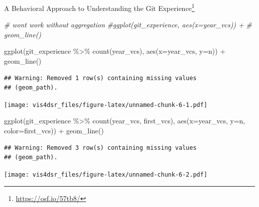 \documentclass[
]{krantz}
\makeatletter
\newenvironment{Shaded}{\begin{snugshade}}{\end{snugshade}}
\newcommand{\AttributeTok}[1]{\textcolor[rgb]{0.61,0.61,0.61}{#1}}
\newcommand{\CommentTok}[1]{\textcolor[rgb]{0.37,0.37,0.37}{\textit{#1}}}
\newcommand{\FunctionTok}[1]{\textcolor[rgb]{0,0,0}{#1}}
\newcommand{\NormalTok}[1]{#1}
\newcommand{\SpecialCharTok}[1]{\textcolor[rgb]{0,0,0}{#1}}
\renewcommand{\href}[2]{#2\footnote{\url{#1}}}
\newenvironment{kframe}{%
\medskip{}
\setlength{\fboxsep}{.8em}
 \def\at@end@of@kframe{}%
 \ifinner\ifhmode%
  \def\at@end@of@kframe{\end{minipage}}%
  \begin{minipage}{\columnwidth}%
 \fi\fi%
 \def\FrameCommand##1{\hskip\@totalleftmargin \hskip-\fboxsep
 \colorbox{shadecolor}{##1}\hskip-\fboxsep
     \hskip-\linewidth \hskip-\@totalleftmargin \hskip\columnwidth}%
 \MakeFramed {\advance\hsize-\width
   \@totalleftmargin\z@ \linewidth\hsize
   \@setminipage}}%
 {\par\unskip\endMakeFramed%
 \at@end@of@kframe}
\renewenvironment{Shaded}{\begin{kframe}}{\end{kframe}}
\makeatother
\begin{document}
\href{https://osf.io/57tb8/}{A Behavioral Approach to Understanding the Git Experience}

\begin{Shaded}
\begin{Highlighting}[]
\CommentTok{\# won\textquotesingle{}t work without aggregation}
\CommentTok{\#ggplot(git\_experience, aes(x=year\_vcs)) +}
\CommentTok{\#  geom\_line()}

\FunctionTok{ggplot}\NormalTok{(git\_experience }\SpecialCharTok{\%\textgreater{}\%} \FunctionTok{count}\NormalTok{(year\_vcs), }\FunctionTok{aes}\NormalTok{(}\AttributeTok{x=}\NormalTok{year\_vcs, }\AttributeTok{y=}\NormalTok{n)) }\SpecialCharTok{+}
  \FunctionTok{geom\_line}\NormalTok{()}
\end{Highlighting}
\end{Shaded}

\begin{verbatim}
## Warning: Removed 1 row(s) containing missing values
## (geom_path).
\end{verbatim}

\texttt{[image: vis4dsr\_files/figure-latex/unnamed-chunk-6-1.pdf]}

\begin{Shaded}
\begin{Highlighting}[]
\FunctionTok{ggplot}\NormalTok{(git\_experience }\SpecialCharTok{\%\textgreater{}\%} \FunctionTok{count}\NormalTok{(year\_vcs, first\_vcs), }\FunctionTok{aes}\NormalTok{(}\AttributeTok{x=}\NormalTok{year\_vcs, }\AttributeTok{y=}\NormalTok{n, }\AttributeTok{color=}\NormalTok{first\_vcs)) }\SpecialCharTok{+}
  \FunctionTok{geom\_line}\NormalTok{()}
\end{Highlighting}
\end{Shaded}

\begin{verbatim}
## Warning: Removed 3 row(s) containing missing values
## (geom_path).
\end{verbatim}

\texttt{[image: vis4dsr\_files/figure-latex/unnamed-chunk-6-2.pdf]}
\end{document}
